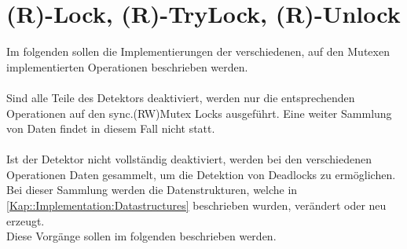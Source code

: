 \section{(R)-Lock, (R)-TryLock, (R)-Unlock}
Im folgenden sollen die Implementierungen der verschiedenen, auf den Mutexen
implementierten Operationen beschrieben werden.\\\\ 
Sind alle Teile des Detektors deaktiviert, werden nur die entsprechenden 
Operationen auf den sync.(RW)Mutex Locks ausgeführt. Eine weiter Sammlung von Daten
findet in diesem Fall nicht statt.\\\\
Ist der Detektor nicht vollständig deaktiviert, werden bei den verschiedenen 
Operationen Daten gesammelt, um die Detektion von Deadlocks zu ermöglichen.  
Bei dieser Sammlung werden die Datenstrukturen,
welche in \ref{Kap::Implementation:Datastructures} beschrieben wurden, verändert
oder neu erzeugt.\\
Diese Vorgänge sollen im folgenden beschrieben werden.

